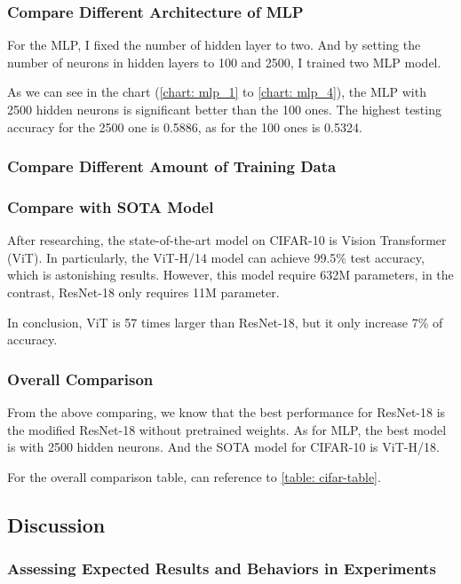 \documentclass[twocolumn]{extarticle}
\begin{document}
\subsubsection{Compare Different Architecture of MLP}

For the MLP, I fixed the number of hidden layer to two. And by setting the number of neurons in hidden layers to 100 and 2500, I trained two MLP model.

As we can see in the chart (\autoref{chart: mlp_1} to \autoref{chart: mlp_4}), the MLP with 2500 hidden neurons is significant better than the 100 ones. The highest testing accuracy for the 2500 one is 0.5886, as for the 100 ones is 0.5324.

\subsubsection{Compare Different Amount of Training Data}

\subsubsection{Compare with SOTA Model}

After researching, the state-of-the-art model on CIFAR-10 is Vision Transformer (ViT). In particularly, the ViT-H/14 model can achieve 99.5\% test accuracy, which is astonishing results. However, this model require 632M parameters, in the contrast, ResNet-18 only requires 11M parameter.

In conclusion, ViT is 57 times larger than ResNet-18, but it only increase 7\% of accuracy.

\subsubsection{Overall Comparison}

From the above comparing, we know that the best performance for ResNet-18 is the modified ResNet-18 without pretrained weights. As for MLP, the best model is with 2500 hidden neurons. And the SOTA model for CIFAR-10 is ViT-H/18. 

For the overall comparison table, can reference to \autoref{table: cifar-table}.


\subsection{Discussion}

\subsubsection{Assessing Expected Results and Behaviors in Experiments}\label{sec: discuss-1}
\end{document}
